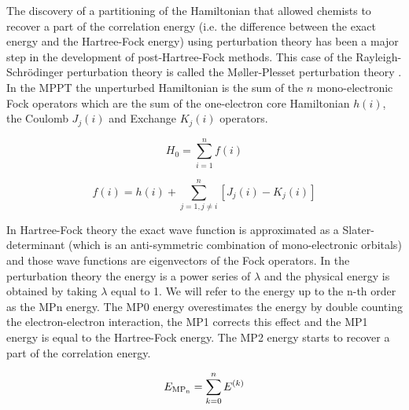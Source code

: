 \documentclass[11pt,a4paper]{article}
\begin{document}
The discovery of a partitioning of the Hamiltonian that allowed chemists to recover a part of the correlation energy (i.e. the difference between the exact energy and the Hartree-Fock energy) using perturbation theory has been a major step in the development of post-Hartree-Fock methods. This case of the Rayleigh-Schrödinger perturbation theory is called the M{\o}ller-Plesset perturbation theory \cite{Moller_1934}. In the MPPT the unperturbed Hamiltonian is the sum of the $n$ mono-electronic Fock operators which are the sum of the one-electron core Hamiltonian $h(i)$, the Coulomb $J_j(i)$ and Exchange $K_j(i)$ operators.
 
\begin{equation}
H_0= \sum\limits_{i=1}^{n} f(i)
\end{equation}

\begin{equation}
f(i) = h(i) + \sum\limits_{j=1,j \neq i}^{n} \left[J_j(i) - K_j(i)\right]
\end{equation}

In Hartree-Fock theory the exact wave function is approximated as a Slater-determinant (which is an anti-symmetric combination of mono-electronic orbitals) and those wave functions are eigenvectors of the Fock operators. In the perturbation theory the energy is a power series of $\lambda$ and the physical energy is obtained by taking $\lambda$ equal to 1. We will refer to the energy up to the n-th order as the MPn energy. The MP0 energy overestimates the energy by double counting the electron-electron interaction, the MP1 corrects this effect and the MP1 energy is equal to the Hartree-Fock energy. The MP2 energy starts to recover a part of the correlation energy.

\begin{equation}
E_{\text{MP\textsubscript{n}}}= \sum_{k=0}^n E^{(k)}
\end{equation}
\end{document}
